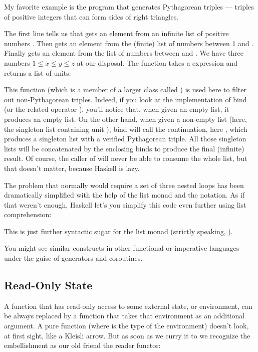 My favorite example is the program that generates Pythagorean triples
--- triples of positive integers that can form sides of right triangles.

The first line tells us that  gets an element from an infinite
list of positive numbers \code{{[}1..{]}}. Then  gets an
element from the (finite) list \code{{[}1..z{]}} of numbers between 1
and . Finally  gets an element from the list of
numbers between  and . We have three numbers
$1 \leqslant x \leqslant y \leqslant z$ at our
disposal. The function  takes a  expression
and returns a list of units:

This function (which is a member of a larger class called
) is used here to filter out non-Pythagorean triples.
Indeed, if you look at the implementation of bind (or the related
operator \code{>>}), you'll notice that,
when given an empty list, it produces an empty list. On the other hand,
when given a non-empty list (here, the singleton list containing unit
\code{{[}(){]}}), bind will call the continuation, here
, which produces a singleton list with a
verified Pythagorean triple. All those singleton lists will be
concatenated by the enclosing binds to produce the final (infinite)
result. Of course, the caller of  will never be able to
consume the whole list, but that doesn't matter, because Haskell is
lazy.

The problem that normally would require a set of three nested loops has
been dramatically simplified with the help of the list monad and the
 notation. As if that weren't enough, Haskell let's you
simplify this code even further using list comprehension:

This is just further syntactic sugar for the list monad (strictly
speaking, ).

You might see similar constructs in other functional or imperative
languages under the guise of generators and coroutines.

\subsection{Read-Only State}

A function that has read-only access to some external state, or
environment, can be always replaced by a function that takes that
environment as an additional argument. A pure function
 (where  is the type of
the environment) doesn't look, at first sight, like a Kleisli arrow. But
as soon as we curry it to
 we recognize the
embellishment as our old friend the reader functor:

